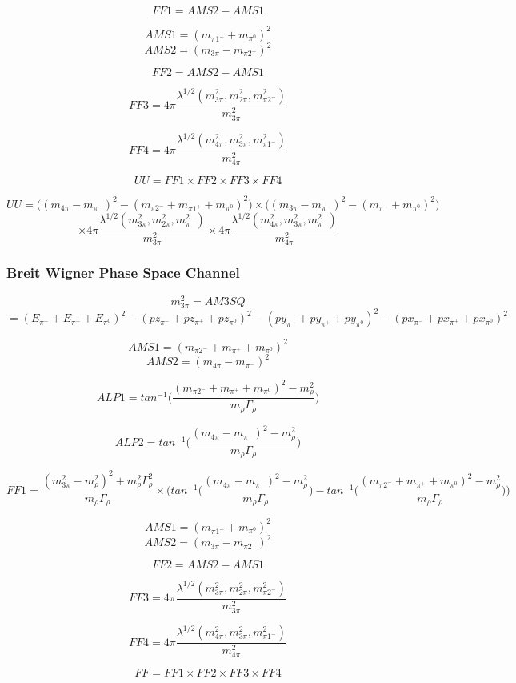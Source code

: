 \documentclass[12pt]{article}
\begin{document}
\[FF1 = AMS2 - AMS1\]

\[AMS1 = (m_{\pi1^+} + m_{\pi^0})^2\]
\[AMS2 = (m_{3\pi}-m_{\pi2^-})^2\]


\[FF2=AMS2-AMS1\]

\[FF3 =  4\pi \frac{\lambda^{1/2}(m_{3\pi}^2, m_{2\pi}^2, m_{\pi2^-}^2)}{m_{3\pi}^2}\]

\[FF4 =  4\pi \frac{\lambda^{1/2}(m_{4\pi}^2, m_{3\pi}^2, m_{\pi1^-}^2)}{m_{4\pi}^2}\]

\[UU = FF1 \times FF2 \times FF3 \times FF4\]

\[UU = \Big((m_{4\pi}-m_{\pi^-})^2 - (m_{\pi2^-} + m_{\pi1^+} + m_{\pi^0})^2\Big) \times
	\Big( (m_{3\pi}-m_{\pi^-})^2 - (m_{\pi^+} + m_{\pi^0})^2\Big)  \]
	\[\times 4\pi \frac{\lambda^{1/2}(m_{3\pi}^2, m_{2\pi}^2, m_{\pi^-}^2)}{m_{3\pi}^2} \times
	4\pi \frac{\lambda^{1/2}(m_{4\pi}^2, m_{3\pi}^2, m_{\pi^-}^2)}{m_{4\pi}^2} \]


\subsubsection{Breit Wigner Phase Space Channel}

\[m_{3\pi}^2 = AM3SQ \]
\[= (E_{\pi^-}+E_{\pi^+}+E_{\pi^0})^2 - (pz_{\pi^-}+pz_{\pi^+}+pz_{\pi^0})^2- (py_{\pi^-}+py_{\pi^+}+py_{\pi^0})^2- (px_{\pi^-}+px_{\pi^+}+px_{\pi^0})^2\]

\[AMS1 = (m_{\pi2^-} + m_{\pi^+} + m_{\pi^0})^2\]
\[AMS2 = (m_{4\pi}-m_{\pi^-})^2\]

\[ALP1 = tan^{-1}\Big(\frac{(m_{\pi2^-} + m_{\pi^+} + m_{\pi^0})^2 - m_\rho^2}{m_\rho \Gamma_\rho}\Big)\]

\[ALP2 = tan^{-1}\Big(\frac{(m_{4\pi}-m_{\pi^-})^2 - m_\rho^2}{m_\rho \Gamma_\rho}\Big)\]


\[FF1 = \frac{(m_{3\pi}^2 - m_\rho^2)^2 + 	m_\rho^2 \Gamma_\rho^2}{m_\rho \Gamma_\rho} \times \Bigg(tan^{-1}\Big(\frac{(m_{4\pi}-m_{\pi^-})^2 - m_\rho^2}{m_\rho \Gamma_\rho}\Big) -  tan^{-1}\Big(\frac{(m_{\pi2^-} + m_{\pi^+} + m_{\pi^0})^2 - m_\rho^2}{m_\rho \Gamma_\rho}\Big)  \Bigg)\]


\[AMS1 = (m_{\pi1^+} + m_{\pi^0})^2\]
\[AMS2 = (m_{3\pi}-m_{\pi2^-})^2\]


\[FF2=AMS2-AMS1\]

\[FF3 =  4\pi \frac{\lambda^{1/2}(m_{3\pi}^2, m_{2\pi}^2, m_{\pi2^-}^2)}{m_{3\pi}^2}\]

\[FF4 =  4\pi \frac{\lambda^{1/2}(m_{4\pi}^2, m_{3\pi}^2, m_{\pi1^-}^2)}{m_{4\pi}^2}\]


\[FF = FF1 \times FF2 \times FF3 \times FF4\]
\end{document}
